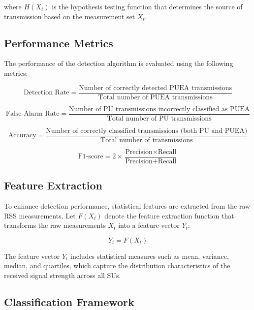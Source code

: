 where $H(X_t)$ is the hypothesis testing function that determines the source of transmission based on the measurement set $X_t$.

\subsection{Performance Metrics}

The performance of the detection algorithm is evaluated using the following metrics:

\begin{equation}
    \text{Detection Rate} = \frac{\text{Number of correctly detected PUEA transmissions}}{\text{Total number of PUEA transmissions}}
\end{equation}

\begin{equation}
    \text{False Alarm Rate} = \frac{\text{Number of PU transmissions incorrectly classified as PUEA}}{\text{Total number of PU transmissions}}
\end{equation}

\begin{equation}
    \text{Accuracy} = \frac{\text{Number of correctly classified transmissions (both PU and PUEA)}}{\text{Total number of transmissions}}
\end{equation}

\begin{equation}
    \text{F1-score} = 2 \times \frac{\text{Precision} \times \text{Recall}}{\text{Precision} + \text{Recall}}
\end{equation}

\subsection{Feature Extraction}

To enhance detection performance, statistical features are extracted from the raw RSS measurements. Let $F(X_t)$ denote the feature extraction function that transforms the raw measurements $X_t$ into a feature vector $Y_t$:

\begin{equation}
    Y_t = F(X_t)
\end{equation}

The feature vector $Y_t$ includes statistical measures such as mean, variance, median, and quartiles, which capture the distribution characteristics of the received signal strength across all SUs.

\subsection{Classification Framework}


